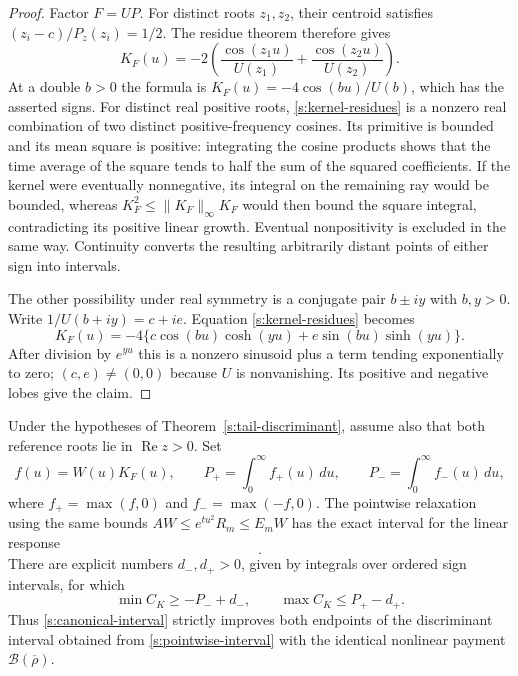 \begin{proof}
Factor $F=UP$.  For distinct roots $z_1,z_2$, their centroid satisfies
$(z_i-c)/P_z(z_i)=1/2$.  The residue theorem therefore gives
\begin{equation}
 K_F(u)=-2\left(\frac{\cos(z_1u)}{U(z_1)}
                         +\frac{\cos(z_2u)}{U(z_2)}\right).
 \label{s:kernel-residues}
\end{equation}
At a double $b>0$ the formula is
$K_F(u)=-4\cos(bu)/U(b)$, which has the asserted signs.
For distinct real positive roots, \eqref{s:kernel-residues} is a
nonzero real combination of two distinct positive-frequency cosines.
Its primitive is bounded and its mean square is positive: integrating
the cosine products shows that the time average of the square tends
to half the sum of the squared coefficients.  If the kernel were
eventually nonnegative, its integral on the remaining ray would be
bounded, whereas $K_F^2\le\|K_F\|_\infty K_F$ would then bound the
square integral, contradicting its positive linear growth.  Eventual
nonpositivity is excluded in the same way.  Continuity converts the
resulting arbitrarily distant points of either sign into intervals.

The other possibility under real symmetry is a conjugate pair
$b\pm iy$ with $b,y>0$.  Write $1/U(b+iy)=c+ie$.  Equation
\eqref{s:kernel-residues} becomes
\[
 K_F(u)=-4\{c\cos(bu)\cosh(yu)+e\sin(bu)\sinh(yu)\}.
\]
After division by $e^{yu}$ this is a nonzero sinusoid plus a term
tending exponentially to zero; $(c,e)\ne(0,0)$ because $U$ is
nonvanishing.  Its positive and negative lobes give the claim.
\end{proof}

\begin{theorem}
\label{s:strict-improvement}
Under the hypotheses of Theorem~\ref{s:tail-discriminant}, assume also
that both reference roots lie in $\operatorname{Re}z>0$.  Set
\[
 f(u)=W(u)K_F(u),\qquad
 P_+=\int_0^\infty f_+(u)\,du,
 \qquad P_-=\int_0^\infty f_-(u)\,du,
\]
where $f_+=\max(f,0)$ and $f_-=\max(-f,0)$.
The pointwise relaxation using the same bounds
$AW\le e^{tu^2}R_m\le E_mW$ has the exact interval for the linear response
\begin{equation}
 [A J_K-(E_m-A)P_-,\ A J_K+(E_m-A)P_+].
 \label{s:pointwise-interval}
\end{equation}
There are explicit numbers $d_-,d_+>0$, given by integrals over
ordered sign intervals, for which
\begin{equation}
 \min C_K\ge-P_-+d_-,\qquad
 \max C_K\le P_+-d_+.
 \label{s:ordered-gains}
\end{equation}
Thus \eqref{s:canonical-interval} strictly improves both endpoints
of the discriminant interval obtained from
\eqref{s:pointwise-interval} with the identical nonlinear payment
$\mathcal B(\overline\rho)$.
\end{theorem}

